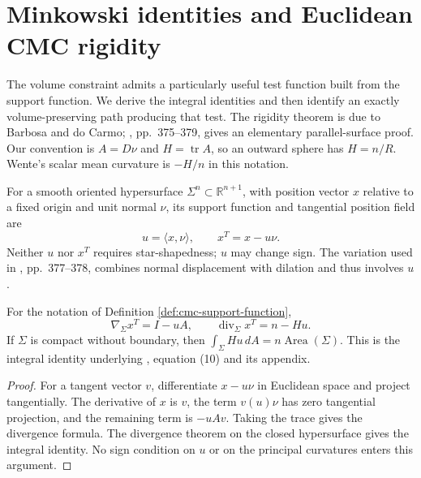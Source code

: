 \chapter{Minkowski identities and Euclidean CMC rigidity}\label{sec:cmc-minkowski}
The volume constraint admits a particularly useful test function built from the support function. We derive the integral identities and then identify an exactly volume-preserving path producing that test. The rigidity theorem is due to Barbosa and do Carmo; \cite{Wen91}, pp.~375--379, gives an elementary parallel-surface proof. Our convention is $A=D\nu$ and $H=\operatorname{tr}A$, so an outward sphere has $H=n/R$. Wente's scalar mean curvature is $-H/n$ in this notation.

\begin{definition}\label{def:cmc-support-function}
For a smooth oriented hypersurface $\Sigma^n\subset\mathbb R^{n+1}$, with position vector $x$ relative to a fixed origin and unit normal $\nu$, its support function and tangential position field are
\[
 u=\langle x,\nu\rangle,\qquad x^T=x-u\nu.
\]
Neither $u$ nor $x^T$ requires star-shapedness; $u$ may change sign. The variation used in \cite{Wen91}, pp.~377--378, combines normal displacement with dilation and thus involves $u$.
\end{definition}

\begin{lemma}\label{lem:cmc-first-minkowski}
For the notation of Definition \ref{def:cmc-support-function},
\[
 \nabla_\Sigma x^T=I-uA,\qquad \operatorname{div}_\Sigma x^T=n-Hu.
\]
If $\Sigma$ is compact without boundary, then $\int_\Sigma Hu\,dA=n\operatorname{Area}(\Sigma)$. This is the integral identity underlying \cite{Wen91}, equation (10) and its appendix.
\end{lemma}
\begin{proof}
For a tangent vector $v$, differentiate $x-u\nu$ in Euclidean space and project tangentially. The derivative of $x$ is $v$, the term $v(u)\nu$ has zero tangential projection, and the remaining term is $-uAv$. Taking the trace gives the divergence formula. The divergence theorem on the closed hypersurface gives the integral identity. No sign condition on $u$ or on the principal curvatures enters this argument.
\end{proof}

